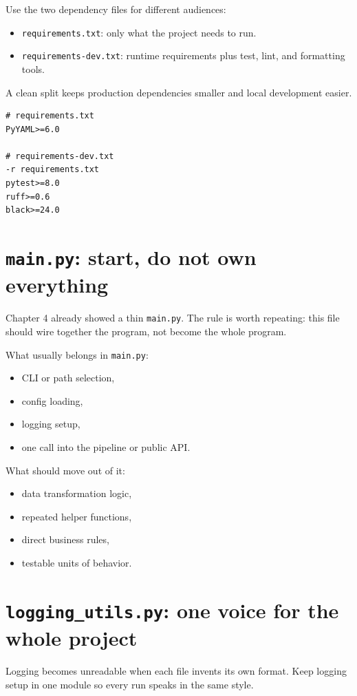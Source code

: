 \documentclass[11pt,oneside]{book}
\begin{document}
Use the two dependency files for different audiences:
\begin{itemize}
  \item \texttt{requirements.txt}: only what the project needs to run.
  \item \texttt{requirements-dev.txt}: runtime requirements plus test, lint, and formatting tools.
\end{itemize}

A clean split keeps production dependencies smaller and local development easier.

\begin{lstlisting}[style=bookcode]
# requirements.txt
PyYAML>=6.0

# requirements-dev.txt
-r requirements.txt
pytest>=8.0
ruff>=0.6
black>=24.0
\end{lstlisting}

\section*{\texttt{main.py}: start, do not own everything}

Chapter 4 already showed a thin \texttt{main.py}.  
The rule is worth repeating: this file should wire together the program, not become the whole program.

What usually belongs in \texttt{main.py}:
\begin{itemize}
  \item CLI or path selection,
  \item config loading,
  \item logging setup,
  \item one call into the pipeline or public API.
\end{itemize}

What should move out of it:
\begin{itemize}
  \item data transformation logic,
  \item repeated helper functions,
  \item direct business rules,
  \item testable units of behavior.
\end{itemize}

\section*{\texttt{logging\_utils.py}: one voice for the whole project}

Logging becomes unreadable when each file invents its own format.  
Keep logging setup in one module so every run speaks in the same style.
\end{document}
